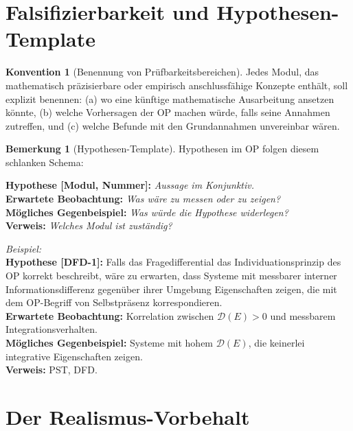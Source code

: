 \documentclass[11pt,a4paper]{article}
\theoremstyle{plain}
\theoremstyle{definition}
\newtheorem{konvention}{Konvention}[section]
\newtheorem{remark}{Bemerkung}[section]
\begin{document}
\section{Falsifizierbarkeit und Hypothesen-Template}

\begin{konvention}[Benennung von Pr\"{u}fbarkeitsbereichen]
Jedes Modul, das mathematisch pr\"{a}zisierbare oder empirisch
anschlussfähige Konzepte enth\"{a}lt, soll explizit benennen:
(a) wo eine k\"{u}nftige mathematische Ausarbeitung ansetzen k\"{o}nnte,
(b) welche Vorhersagen der OP machen w\"{u}rde, falls seine Annahmen
zutreffen, und (c) welche Befunde mit den Grundannahmen unvereinbar w\"{a}ren.
\end{konvention}

\begin{remark}[Hypothesen-Template]
Hypothesen im OP folgen diesem schlanken Schema:

\medskip
\noindent\textbf{Hypothese [Modul, Nummer]:} \textit{Aussage im Konjunktiv.}\\
\textbf{Erwartete Beobachtung:} \textit{Was w\"{a}re zu messen oder zu zeigen?}\\
\textbf{M\"{o}gliches Gegenbeispiel:} \textit{Was w\"{u}rde die Hypothese
widerlegen?}\\
\textbf{Verweis:} \textit{Welches Modul ist zust\"{a}ndig?}

\medskip
\textit{Beispiel:}\\
\textbf{Hypothese [DFD-1]:} Falls das Fragedifferential das Individuationsprinzip
des OP korrekt beschreibt, w\"{a}re zu erwarten, dass Systeme mit messbarer
interner Informationsdifferenz gegen\"{u}ber ihrer Umgebung Eigenschaften zeigen,
die mit dem OP-Begriff von Selbstpr\"{a}senz korrespondieren.\\
\textbf{Erwartete Beobachtung:} Korrelation zwischen $\mathcal{D}(E) > 0$
und messbarem Integrationsverhalten.\\
\textbf{M\"{o}gliches Gegenbeispiel:} Systeme mit hohem $\mathcal{D}(E)$,
die keinerlei integrative Eigenschaften zeigen.\\
\textbf{Verweis:} PST, DFD.
\end{remark}

\section{Der Realismus-Vorbehalt}
\end{document}

